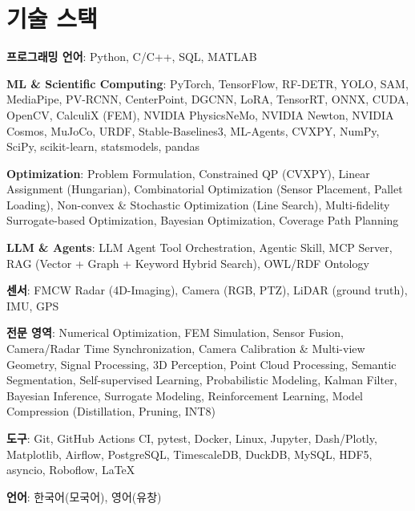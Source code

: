 \documentclass[a4paper,11pt]{article}
\begin{document}
\section{기술 스택}
 \begin{itemize}[leftmargin=0.15in, label={}, itemsep=0pt, parsep=0pt, topsep=0pt]
    \small{\item{\textbf{프로그래밍 언어}{: Python, C/C++, SQL, MATLAB}}}
    \small{\item{\textbf{ML \& Scientific Computing}{: PyTorch, TensorFlow, RF-DETR, YOLO, SAM, MediaPipe, PV-RCNN, CenterPoint, DGCNN, LoRA, TensorRT, ONNX, CUDA, OpenCV, CalculiX (FEM), NVIDIA PhysicsNeMo, NVIDIA Newton, NVIDIA Cosmos, MuJoCo, URDF, Stable-Baselines3, ML-Agents, CVXPY, NumPy, SciPy, scikit-learn, statsmodels, pandas}}}
    \small{\item{\textbf{Optimization}{: Problem Formulation, Constrained QP (CVXPY), Linear Assignment (Hungarian), Combinatorial Optimization (Sensor Placement, Pallet Loading), Non-convex \& Stochastic Optimization (Line Search), Multi-fidelity Surrogate-based Optimization, Bayesian Optimization, Coverage Path Planning}}}
    \small{\item{\textbf{LLM \& Agents}{: LLM Agent Tool Orchestration, Agentic Skill, MCP Server, RAG (Vector + Graph + Keyword Hybrid Search), OWL/RDF Ontology}}}
    \small{\item{\textbf{센서}{: FMCW Radar (4D-Imaging), Camera (RGB, PTZ), LiDAR (ground truth), IMU, GPS}}}
    \small{\item{\textbf{전문 영역}{: Numerical Optimization, FEM Simulation, Sensor Fusion, Camera/Radar Time Synchronization, Camera Calibration \& Multi-view Geometry, Signal Processing, 3D Perception, Point Cloud Processing, Semantic Segmentation, Self-supervised Learning, Probabilistic Modeling, Kalman Filter, Bayesian Inference, Surrogate Modeling, Reinforcement Learning, Model Compression (Distillation, Pruning, INT8)}}}
    \small{\item{\textbf{도구}{: Git, GitHub Actions CI, pytest, Docker, Linux, Jupyter, Dash/Plotly, Matplotlib, Airflow, PostgreSQL, TimescaleDB, DuckDB, MySQL, HDF5, asyncio, Roboflow, \LaTeX}}}
    \small{\item{\textbf{언어}{: 한국어(모국어), 영어(유창)}}}
 \end{itemize}

\end{document}
